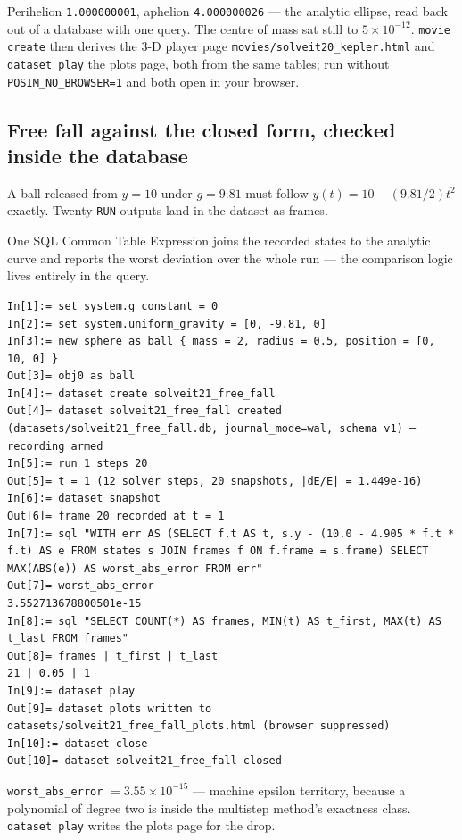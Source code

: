 \documentclass[11pt]{article}
\newcommand{\kw}[1]{\texttt{\uppercase{#1}}}
\newcommand{\code}[1]{\texttt{#1}}
\begin{document}
Perihelion \code{1.000000001}, aphelion \code{4.000000026} --- the
analytic ellipse, read back out of a database with one query. The
centre of mass sat still to $5\times10^{-12}$. \code{movie create}
then derives the 3-D player page \code{movies/solveit20\_kepler.html}
and \code{dataset play} the plots page, both from the same tables; run
without \code{POSIM\_NO\_BROWSER=1} and both open in your browser.

\subsection{Free fall against the closed form, checked inside the database}

A ball released from $y = 10$ under $g = 9.81$ must follow
$y(t) = 10 - (9.81/2)t^2$ exactly. Twenty \kw{run} outputs land in the
dataset as frames.

One SQL Common Table Expression joins the recorded states to the
analytic curve and reports the worst deviation over the whole run ---
the comparison logic lives entirely in the query.

\begin{lstlisting}
In[1]:= set system.g_constant = 0
In[2]:= set system.uniform_gravity = [0, -9.81, 0]
In[3]:= new sphere as ball { mass = 2, radius = 0.5, position = [0, 10, 0] }
Out[3]= obj0 as ball
In[4]:= dataset create solveit21_free_fall
Out[4]= dataset solveit21_free_fall created (datasets/solveit21_free_fall.db, journal_mode=wal, schema v1) — recording armed
In[5]:= run 1 steps 20
Out[5]= t = 1 (12 solver steps, 20 snapshots, |dE/E| = 1.449e-16)
In[6]:= dataset snapshot
Out[6]= frame 20 recorded at t = 1
In[7]:= sql "WITH err AS (SELECT f.t AS t, s.y - (10.0 - 4.905 * f.t * f.t) AS e FROM states s JOIN frames f ON f.frame = s.frame) SELECT MAX(ABS(e)) AS worst_abs_error FROM err"
Out[7]= worst_abs_error
3.552713678800501e-15
In[8]:= sql "SELECT COUNT(*) AS frames, MIN(t) AS t_first, MAX(t) AS t_last FROM frames"
Out[8]= frames | t_first | t_last
21 | 0.05 | 1
In[9]:= dataset play
Out[9]= dataset plots written to datasets/solveit21_free_fall_plots.html (browser suppressed)
In[10]:= dataset close
Out[10]= dataset solveit21_free_fall closed
\end{lstlisting}

\code{worst\_abs\_error} $= 3.55\times10^{-15}$ --- machine epsilon
territory, because a polynomial of degree two is inside the multistep
method's exactness class. \code{dataset play} writes the plots page
for the drop.
\end{document}
